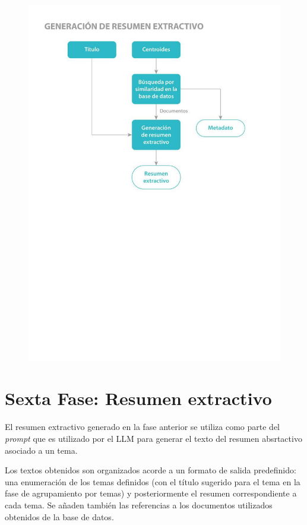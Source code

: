    \begin{figure}[H]    
        \centering
        \includegraphics[scale = 1]{Figures/pipeline_4.jpg}
        \caption*{}
    \end{figure}

    \section{Sexta Fase: Resumen extractivo}
    El resumen extractivo generado en la fase anterior se utiliza como parte del \emph{prompt} que es utilizado por el LLM para generar el texto del resumen absrtactivo asociado a un tema.

    Los textos obtenidos son organizados acorde a un formato de salida predefinido: una enumeración de los temas definidos (con el título sugerido para el tema en la fase de agrupamiento por temas) y posteriormente el resumen correspondiente a cada tema. Se añaden también las referencias a los documentos utilizados obtenidos de la base de datos.

